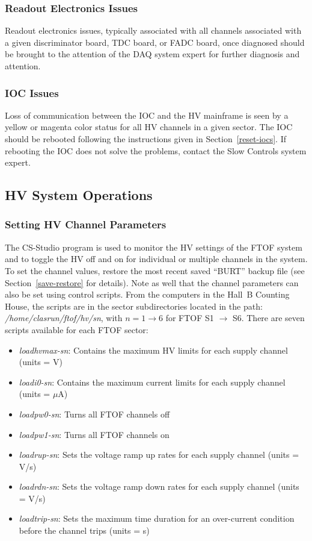 \documentclass[12pt]{article}
\begin{document}
\subsubsection{Readout Electronics Issues}
\label{readout-issues}

Readout electronics issues, typically associated with all channels associated with a 
given discriminator board, TDC board, or FADC board, once diagnosed should be brought 
to the attention of the DAQ system expert for further diagnosis and attention.

\subsubsection{IOC Issues}
\label{ioc-issues}

Loss of communication between the IOC and the HV mainframe is seen by a yellow or 
magenta color status for all HV channels in a given sector. The IOC should be rebooted 
following the instructions given in Section~\ref{reset-iocs}. If rebooting the IOC does 
not solve the problems, contact the Slow Controls system expert.

\subsection{HV System Operations}

\subsubsection{Setting HV Channel Parameters}
\label{hv-parms}

The CS-Studio program is used to monitor the HV settings of the FTOF system and to 
toggle the HV off and on for individual or multiple channels in the system. To set the
channel values, restore the most recent saved ``BURT'' backup file (see
Section~\ref{save-restore} for details). Note as well that the channel parameters can
also be set using control scripts. From the computers in the Hall~B Counting House, the
scripts are in the sector subdirectories located in the path: {\it /home/clasrun/ftof/hv/sn}, 
with $n = 1 \to 6$ for FTOF S1 $\to$ S6. There are seven scripts available for 
each FTOF sector:

\begin{itemize}
\item {\it loadhvmax-sn}: Contains the maximum HV limits for each supply channel (units 
= V)
\item {\it loadi0-sn}: Contains the maximum current limits for each supply channel 
(units = $\mu$A)
\item {\it loadpw0-sn}: Turns all FTOF channels off
\item {\it loadpw1-sn}: Turns all FTOF channels on
\item {\it loadrup-sn}: Sets the voltage ramp up rates for each supply channel (units 
= V/s)
\item {\it loadrdn-sn}: Sets the voltage ramp down rates for each supply channel (units 
= V/s)
\item {\it loadtrip-sn}: Sets the maximum time duration for an over-current condition 
before the channel trips (units = s)
\end{itemize}
\end{document}

